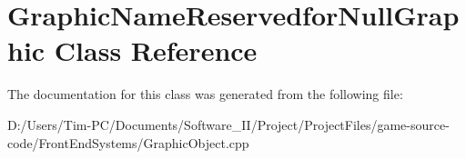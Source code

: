 \hypertarget{class_graphic_name_reservedfor_null_graphic}{}\section{Graphic\+Name\+Reservedfor\+Null\+Graphic Class Reference}
\label{class_graphic_name_reservedfor_null_graphic}


The documentation for this class was generated from the following file\+:\begin{DoxyCompactItemize}
\item 
D\+:/\+Users/\+Tim-\/\+P\+C/\+Documents/\+Software\+\_\+\+I\+I/\+Project/\+Project\+Files/game-\/source-\/code/\+Front\+End\+Systems/Graphic\+Object.\+cpp\end{DoxyCompactItemize}
